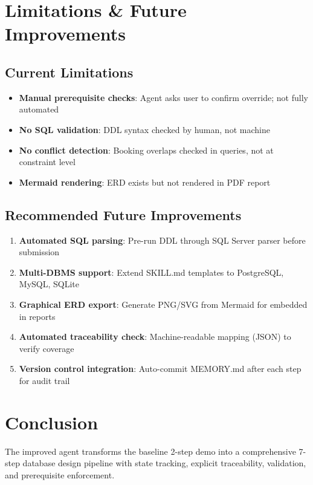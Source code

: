 \documentclass[12pt,a4paper]{article}
\begin{document}
\section{Limitations \& Future Improvements}

\subsection{Current Limitations}
\begin{itemize}
    \item \textbf{Manual prerequisite checks}: Agent asks user to confirm override; not fully automated
    \item \textbf{No SQL validation}: DDL syntax checked by human, not machine
    \item \textbf{No conflict detection}: Booking overlaps checked in queries, not at constraint level
    \item \textbf{Mermaid rendering}: ERD exists but not rendered in PDF report
\end{itemize}

\subsection{Recommended Future Improvements}
\begin{enumerate}
    \item \textbf{Automated SQL parsing}: Pre-run DDL through SQL Server parser before submission
    \item \textbf{Multi-DBMS support}: Extend SKILL.md templates to PostgreSQL, MySQL, SQLite
    \item \textbf{Graphical ERD export}: Generate PNG/SVG from Mermaid for embedded in reports
    \item \textbf{Automated traceability check}: Machine-readable mapping (JSON) to verify coverage
    \item \textbf{Version control integration}: Auto-commit MEMORY.md after each step for audit trail
\end{enumerate}

\section{Conclusion}

The improved agent transforms the baseline 2-step demo into a comprehensive 7-step database design pipeline with state tracking, explicit traceability, validation, and prerequisite enforcement.
\end{document}
